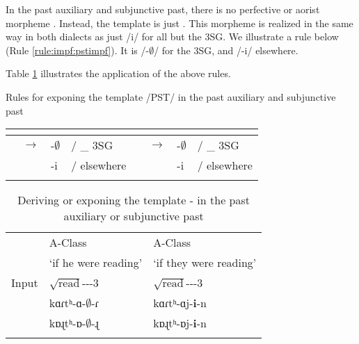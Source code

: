 In the past auxiliary and subjunctive past, there is no perfective or aorist morpheme {\aor}. Instead, the template is just {\pst}. This morpheme is realized in the same way in both dialects as just /i/ for all but the 3SG. We illustrate a rule below (Rule \ref{rule:impf:pstimpf}). It is /-$\emptyset$/ for the 3SG, and /-i/ elsewhere. 

Table \ref{tab:deriv:nonperfpast}   illustrates the application of the above rules. 

\begin{newruleblock}
	{Rules for exponing the template /PST/ in the past auxiliary and subjunctive past} %
	
	\begin{center}
		
		
		\begin{tabular}{llllllll}
			\lsptoprule
			\multicolumn{4}{l}{{\seaSE}} & \multicolumn{4}{l}{{\iaIA}} \\\midrule 
			{\pst} &$\rightarrow$ & -$\emptyset$  & / \_ 3SG &    {\pst} &$\rightarrow$ & -$\emptyset$  & / \_  3SG      \\
			&& -i & / elsewhere  
			&
			&& -i & / elsewhere  
			\\ \lspbottomrule 
			
		\end{tabular}
	\end{center}
	
\end{newruleblock} 


\begin{table}
	\caption{Deriving or exponing the template {\aor}-{\pst} in the past auxiliary or subjunctive past}
	\label{tab:deriv:nonperfpast}  
	{%
			\begin{tabular}{lll}
				\lsptoprule
				&    A-Class & A-Class  \\
				&  `if he were reading' & `if they were reading'\\%
				Input & $\sqrt{\text{read}}$-{\thgloss}-\textbf{{\pst}}-3{\sg} & $\sqrt{\text{read}}$-{\thgloss}-\textbf{{\pst}}-3{\pl}  
				\\\midrule
				{\seaAbbre} & kɑɾtʰ-ɑ-\textbf{$\pmb{\emptyset}$}-ɾ  & kɑɾtʰ-ɑj-\textbf{i}-n
				\\
				{\iaAbbre} & kɒɻtʰ-ɒ-\textbf{$\pmb{\emptyset}$}-ɻ  & kɒɻtʰ-ɒj-\textbf{i}-n
				\\
				\lspbottomrule    \end{tabular}
			
		}
	\end{table}
	
